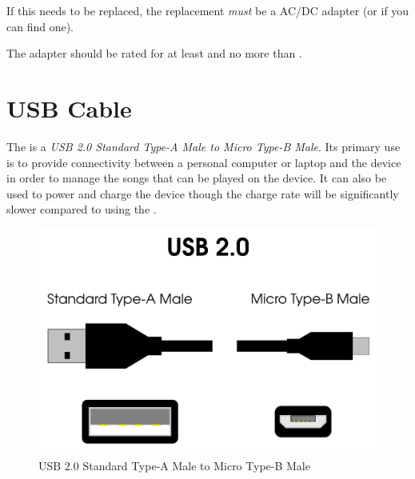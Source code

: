 If this needs to be replaced, the replacement \textit{must} be a
 AC/DC adapter (or  if you can find
one).



The adapter should be rated for at least  and no more than
.

\section{USB Cable} \label{USB Cable}

The  is a \textit{USB 2.0 Standard Type-A Male to Micro Type-B Male}.
Its primary use is to provide connectivity between a personal computer or
laptop and the device in order to manage the songs that can be played on the
device.  It can also be used to power and charge the device though the charge
rate will be significantly slower compared to using the .

\begin{figure}[H]
\centering
  \includegraphics{images/usb_cable.png}
\caption{USB 2.0 Standard Type-A Male to Micro Type-B Male}
\end{figure}

